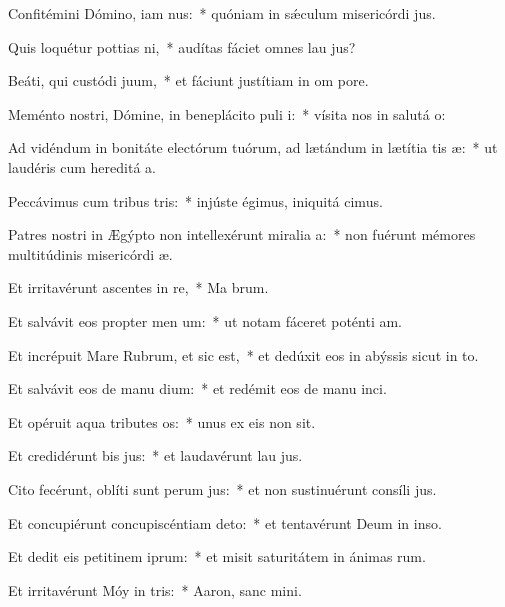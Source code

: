 \item Confitémini Dómino, iam nus:~* quóniam in sǽculum misericórdi jus.
\item Quis loquétur pottias ni,~* audítas fáciet omnes lau jus?
\item Beáti, qui custódi juum,~* et fáciunt justítiam in om pore.
\item Meménto nostri, Dómine, in beneplácito puli i:~* vísita nos in salutá o:
\item Ad vidéndum in bonitáte electórum tuórum, ad lætándum in lætítia tis æ:~* ut laudéris cum hereditá a.
\item Peccávimus cum tribus tris:~* injúste égimus, iniquitá cimus.
\item Patres nostri in Ægýpto non intellexérunt miralia a:~* non fuérunt mémores multitúdinis misericórdi æ.
\item Et irritavérunt ascentes in re,~* Ma brum.
\item Et salvávit eos propter men um:~* ut notam fáceret poténti am.
\item Et incrépuit Mare Rubrum, et sic est,~* et dedúxit eos in abýssis sicut in to.
\item Et salvávit eos de manu dium:~* et redémit eos de manu inci.
\item Et opéruit aqua tributes os:~* unus ex eis non sit.
\item Et credidérunt bis jus:~* et laudavérunt lau jus.
\item Cito fecérunt, oblíti sunt perum jus:~* et non sustinuérunt consíli jus.
\item Et concupiérunt concupiscéntiam  deto:~* et tentavérunt Deum in inso.
\item Et dedit eis petitinem iprum:~* et misit saturitátem in ánimas rum.
\item Et irritavérunt Móy in tris:~* Aaron, sanc mini.
